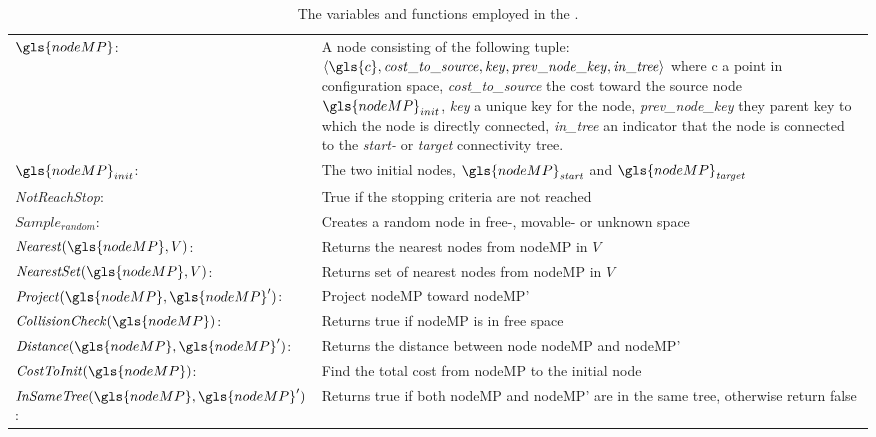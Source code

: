 \noindent
\begin{table}[H]
\caption{The variables and functions employed in the .}
\label{table:functions_for_proposed_rrt_star}
\centering
  \begin{tabular}%
  {>{\raggedright\arraybackslash}p{}%
   >{\raggedright\arraybackslash}p{}}
   $\gls{nodeMP}$:& A node consisting of the following tuple: $ \left\langle \gls{c}, \mathit{cost\_to\_source}, \mathit{key}, \mathit{prev\_node\_key}, \mathit{in\_tree} \right\rangle$ where \gls{c} a point in configuration space, \textit{cost\_to\_source} the cost toward the source node $\gls{nodeMP}_{init}$, \textit{key} a unique key for the node, \textit{prev\_node\_key} they parent key to which the node is directly connected, \textit{in\_tree} an indicator that the node is connected to the \textit{start-} or \textit{target} connectivity tree.\\
 $\gls{nodeMP}_{init}$:& The two initial nodes, $\gls{nodeMP}_{\mathit{start}}$ and $\gls{nodeMP}_{\mathit{target}}$\\
  \textit{NotReachStop}:& True if the stopping criteria are not reached\\
  $\mathit{Sample_{random}}$:& Creates a random node in free-, movable- or unknown space\\
  $\mathit{Nearest}(\gls{nodeMP}, V)$:& Returns the nearest nodes from \gls{nodeMP} in $V$\\
  $\mathit{NearestSet}(\gls{nodeMP}, V)$:& Returns set of nearest nodes from \gls{nodeMP} in $V$\\
  $\mathit{Project}(\gls{nodeMP}, \gls{nodeMP}')$:& Project \gls{nodeMP} toward \gls{nodeMP}'\\
  $\mathit{CollisionCheck}(\gls{nodeMP})$:& Returns true if \gls{nodeMP} is in free space\\
  $\mathit{Distance}(\gls{nodeMP}, \gls{nodeMP}')$:& Returns the distance between node \gls{nodeMP} and \gls{nodeMP}'\\
  $\mathit{CostToInit}(\gls{nodeMP})$:& Find the total cost from \gls{nodeMP} to the initial node\\
    $\mathit{InSameTree}(\gls{nodeMP}, \gls{nodeMP}')$:& Returns true if both \gls{nodeMP} and \gls{nodeMP}' are in the same tree, otherwise return false\\
  \end{tabular}
\end{table}
